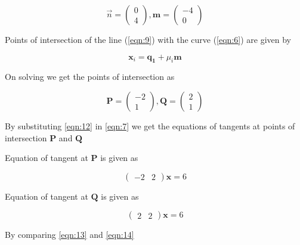 \documentclass[journal,10pt,twocolumn]{article}
\let\vec\mathbf
\newcommand{\myvec}[1]{\ensuremath{\begin{pmatrix}#1\end{pmatrix}}}
\begin{document}
    \begin{equation}
    \label{eqn:10}
        \Vec{n} = \myvec{0 \\ 4} , \vec{m} = \myvec{-4 \\ 0}
    \end{equation}
    
    \begin{flushleft}
        Points of intersection of the line (\eqref{eqn:9}) with the curve (\eqref{eqn:6}) are given by
    \end{flushleft}
    
    \begin{equation}
    \label{eqn:11}
        \vec{x}_i = \vec{q_1} + \mu_i\vec{m}
    \end{equation}
    
    \begin{flushleft}
        On solving we get the points of intersection as
    \end{flushleft}
    
    \begin{equation}
    \label{eqn:12}
        \vec{P} = \myvec{-2 \\ 1} , \vec{Q} = \myvec{2 \\ 1}
    \end{equation}
    
    \begin{flushleft}
        By substituting \eqref{eqn:12} in \eqref{eqn:7} we get the equations of tangents at points of intersection $\vec{P}$ and $\vec{Q}$
    \end{flushleft}
    
    \begin{flushleft}
        Equation of tangent at $\vec{P}$ is given as
    \end{flushleft}
    
    \begin{equation}
    \label{eqn:13}
        \myvec{-2 & 2}\vec{x} = 6
    \end{equation}
    
    \begin{flushleft}
        Equation of tangent at $\vec{Q}$ is given as
    \end{flushleft}
        
    \begin{equation}
    \label{eqn:14}
        \myvec{2 & 2}\vec{x} = 6
    \end{equation}
        
    \begin{flushleft}
        By comparing \eqref{eqn:13} and \eqref{eqn:14}
    \end{flushleft}
    
\end{document}
